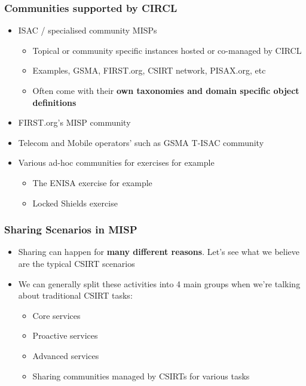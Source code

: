 \begin{frame}
\frametitle{Communities supported by CIRCL}
\begin{itemize}
        \item ISAC / specialised community MISPs
        \begin{itemize}
            \item Topical or community specific instances hosted or co-managed by CIRCL
            \item Examples, GSMA, FIRST.org, CSIRT network, PISAX.org, etc
            \item Often come with their {\bf own taxonomies and domain specific object definitions}
        \end{itemize}
	\item FIRST.org's MISP community
	\item Telecom and Mobile operators' such as GSMA T-ISAC community
	\item Various ad-hoc communities for exercises for example
	\begin{itemize}
		\item The ENISA exercise for example
         \item Locked Shields exercise
	\end{itemize}
\end{itemize}
\end{frame}

\begin{frame}
\frametitle{Sharing Scenarios in MISP}
\begin{itemize}
	\item Sharing can happen for {\bf many different reasons}. Let's see what we believe are the typical CSIRT scenarios
        \item We can generally split these activities into 4 main groups when we're talking about traditional CSIRT tasks:
	\begin{itemize}
		\item Core services
		\item Proactive services
		\item Advanced services
		\item Sharing communities managed by CSIRTs for various tasks
	\end{itemize}
\end{itemize}
\end{frame}

